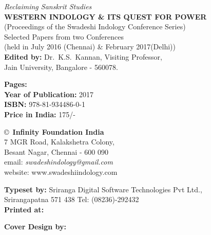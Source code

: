 \thispagestyle{empty}
\noindent
{\fontsize{9}{11}\selectfont\sl Reclaiming Sanskrit Studies}\\
{\bf WESTERN INDOLOGY \& ITS QUEST FOR POWER}\\ 
(Proceedings of the Swadeshi Indology Conference Series)\\
Selected Papers from two Conferences\\ 
(held in July 2016 (Chennai) \& February 2017(Delhi))\\
{\bf Edited by:} Dr.\ K.S.\ Kannan, Visiting Professor,\\ 
Jain University, Bangalore - 560078.
\vfill

\noindent
{\bf Pages:} \pageref{bookend}\\
{\bf Year of Publication:} 2017\\
{\bf ISBN:} 978-81-934486-0-1\\
{\bf Price in India:} 175/-
\vfill

\noindent
\copyright\ {\bf Infinity Foundation India}\\ 
7 MGR Road, Kalakshetra Colony,\\ 
Besant Nagar, Chennai - 600 090\\
email: {\sl swadeshindology@gmail.com}\\ 
website: www.swadeshiindology.com 
\vfill

\noindent
{\bf Typeset by:} Sriranga Digital Software Technologies Pvt Ltd.,\\ 
Srirangapatna 571 438 Tel: (08236)-292432\\

\noindent
{\bf Printed at:}

\noindent
{\bf Cover Design by:}
